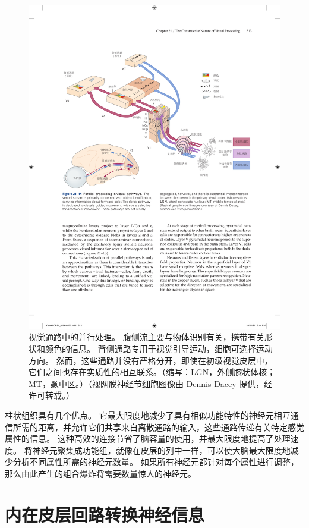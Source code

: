\begin{figure}[htbp]
	\centering
	\includegraphics[width=1.0\linewidth]{chap21/fig_21_14}
	\caption{视觉通路中的并行处理。
		腹侧流主要与物体识别有关，携带有关形状和颜色的信息。
		背侧通路专用于视觉引导运动，细胞可选择运动方向。
		然而，这些通路并没有严格分开，即使在初级视觉皮层中，它们之间也存在实质性的相互联系。（缩写：LGN，外侧膝状体核；MT，颞中区。）（视网膜神经节细胞图像由 Dennis Dacey 提供，经许可转载。）}
	\label{fig:21_14}
\end{figure}


柱状组织具有几个优点。
它最大限度地减少了具有相似功能特性的神经元相互通信所需的距离，并允许它们共享来自离散通路的输入，这些通路传递有关特定感觉属性的信息。
这种高效的连接节省了脑容量的使用，并最大限度地提高了处理速度。
将神经元聚集成功能组，就像在皮层的列中一样，可以使大脑最大限度地减少分析不同属性所需的神经元数量。
如果所有神经元都针对每个属性进行调整，那么由此产生的组合爆炸将需要数量惊人的神经元。



\section{内在皮层回路转换神经信息}

